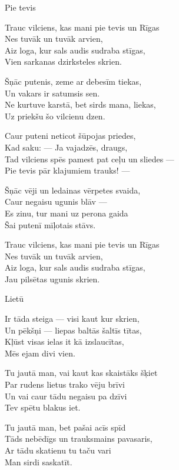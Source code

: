 \documentclass[14pt]{extarticle}
\begin{document}
{{\newpage

{\large \sc Pie tevis}

Trauc vilciens, kas mani pie tevis un Rīgas\\
Nes tuvāk un tuvāk arvien,\\
Aiz loga, kur sals audis sudraba stīgas,\\
Vien sarkanas dzirksteles skrien.

Šņāc putenis, zeme ar debesīm tiekas,\\
Un vakars ir satumsis sen.\\
Ne kurtuve karstā, bet sirds mana, liekas,\\
Uz priekšu šo vilcienu dzen. 

Caur puteni neticot šūpojas priedes,\\
Kad saku: --- Ja vajadzēs, draugs,\\
Tad vilciens spēs pamest pat ceļu un sliedes ---\\
Pie tevis pār klajumiem trauks! ---

Šņāc vēji un ledainas vērpetes svaida,\\
Caur negaisu ugunis blāv ---\\
Es zinu, tur mani uz perona gaida\\
Šai putenī mīļotais stāvs. 

Trauc vilciens, kas mani pie tevis un Rīgas\\
Nes tuvāk un tuvāk arvien,\\
Aiz loga, kur sals audis sudraba stīgas,\\
Jau pilsētas ugunis skrien. 



\newpage

{\large \sc Lietū}

Ir tāda steiga --- visi kaut kur skrien,\\
Un pēkšņi --- liepas baltās šaltīs tītas,\\
Kļūst visas ielas it kā izslaucītas,\\
Mēs ejam divi vien. 

Tu jautā man, vai kaut kas skaistāks šķiet\\
Par rudens lietus trako vēju brīvi\\
Un vai caur tādu negaisu pa dzīvi\\
Tev spētu blakus iet. 

Tu jautā man, bet pašai acīs spīd\\
Tāds nebēdīgs un trauksmains pavasaris,\\
Ar tādu skatienu tu taču vari\\
Man sirdi saskatīt.

}}
\end{document}
